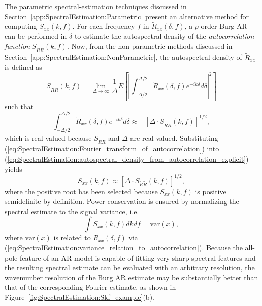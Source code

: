 The parametric spectral-estimation techniques discussed in
Section~\ref{app:SpectralEstimation:Parametric}
present an alternative method for computing $S_{xx}(k, f)$.
For each frequency $f$ in $\tilde{R}_{xx}(\delta, f)$,
a $p$-order Burg AR can be performed in $\delta$
to estimate the autospectral density
of the \emph{autocorrelation function} $S_{\tilde{R}\tilde{R}}(k, f)$.
Now, from the non-parametric methods discussed in
Section~\ref{app:SpectralEstimation:NonParametric},
the autospectral density of $\tilde{R}_{xx}$ is defined as
\begin{equation}
  S_{\tilde{R}\tilde{R}}(k, f)
  =
  \lim_{\Delta \rightarrow \infty}
  \frac{1}{\Delta}
  E\left[%
    \left|
      \int_{-\Delta / 2}^{\Delta / 2}
      \tilde{R}_{xx}(\delta, f)
      e^{-i k \delta} d\delta
    \right|^2
  \right]
\end{equation}
such that
\begin{equation}
  \int_{-\Delta / 2}^{\Delta / 2}
  \tilde{R}_{xx}(\delta, f)
  e^{-i k \delta} d\delta
  \approx
  \pm \left[ \Delta \cdot S_{\tilde{R}\tilde{R}}(k, f) \right]^{1 / 2},
  \label{eq:SpectralEstimation:Fourier_transform_of_autocorrelation}
\end{equation}
which is real-valued because $S_{\tilde{R}\tilde{R}}$ and $\Delta$
are real-valued.
Substituting (\ref{eq:SpectralEstimation:Fourier_transform_of_autocorrelation})
into (\ref{eq:SpectralEstimation:autospectral_density_from_autocorrelation_explicit})
yields
\begin{equation}
  S_{xx}(k, f)
  \approx
  \left[
    \Delta
    \cdot
    S_{\tilde{R}\tilde{R}}(k, f)
  \right]^{1 / 2},
  \label{eq:SpectralEstimation:autospectral_density_Burg}
\end{equation}
where the positive root has been selected
because $S_{xx}(k, f)$ is positive semidefinite by definition.
Power conservation is ensured by normalizing
the spectral estimate to the signal variance, i.e.\
\begin{equation}
  \int S_{xx}(k, f) dk df
  =
  \text{var}(x),
\end{equation}
where $\text{var}(x)$ is related to $R_{xx}(\delta, f)$ via
(\ref{eq:SpectralEstimation:variance_relation_to_autocorrelation}).
Because the all-pole feature of an AR model
is capable of fitting very sharp spectral features
and the resulting spectral estimate can be evaluated
with an arbitrary resolution,
the wavenumber resolution of the Burg AR estimate
may be substantially better than that of the corresponding Fourier estimate,
as shown in Figure~\ref{fig:SpectralEstimation:Skf_example}(b).




